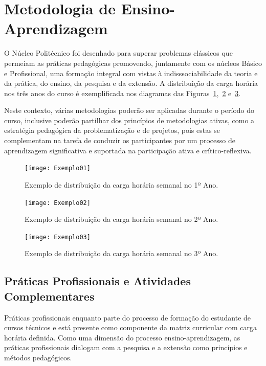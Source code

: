 \documentclass[11pt,fleqn]{book} %
\begin{document}
\section{Metodologia de Ensino-Aprendizagem}\label{metodologia}
\indent

O Núcleo Politécnico foi desenhado para superar problemas clássicos que permeiam as práticas pedagógicas promovendo, juntamente com os núcleos Básico e Profissional, uma formação integral com vistas à indisssociabilidade da teoria e da prática, do ensino, da pesquisa e da extensão. 
A distribuição da carga horária nos três anos do curso é exemplificada nos diagramas das Figuras~\ref{fig:DiagramaSemanal01},~\ref{fig:DiagramaSemanal02} e~\ref{fig:DiagramaSemanal03}.

Neste contexto, várias metodologias poderão ser aplicadas durante o período do curso, inclusive poderão partilhar dos princípios de metodologias ativas, como a estratégia pedagógica da problematização e de projetos, pois estas se complementam na tarefa de conduzir os participantes por um processo de aprendizagem significativa e suportada na participação ativa e crítico-reflexiva. 

\begin{figure}[!htp]
	\centering
	\texttt{[image: Exemplo01]}
	\caption{Exemplo de distribuição da carga horária semanal no 1º Ano.}
	\label{fig:DiagramaSemanal01}
\end{figure}

\begin{figure}[!htp]
	\centering	
	\texttt{[image: Exemplo02]}
	\caption{Exemplo de distribuição da carga horária semanal no 2º Ano.}
	\label{fig:DiagramaSemanal02}
\end{figure}

\begin{figure}[!htp]
	\centering	
	\texttt{[image: Exemplo03]}
	\caption{Exemplo de distribuição da carga horária semanal no 3º Ano.}
	\label{fig:DiagramaSemanal03}
\end{figure}

\subsection{Práticas Profissionais e Atividades Complementares}\label{praticasprofissionais}
\indent

Práticas profissionais enquanto parte do processo de formação do estudante de cursos técnicos e está presente como componente da matriz curricular com carga horária definida.
Como uma dimensão do processo ensino-aprendizagem, as práticas profissionais dialogam com a pesquisa e a extensão como princípios e métodos pedagógicos. 
\end{document}
